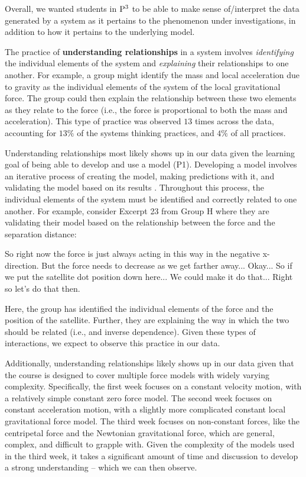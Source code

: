 \documentclass{msuphddissertation}
\begin{document}
\begin{doublespace}
Overall, we wanted students in ${\rm P}^{3}$ to be able to make sense of/interpret the data generated by a system as it pertains to the phenomenon under investigations, in addition to how it pertains to the underlying model.

The practice of \textbf{understanding relationships} in a system involves \textit{identifying} the individual elements of the system and \textit{explaining} their relationships to one another.  For example, a group might identify the mass and local acceleration due to gravity as the individual elements of the system of the local gravitational force.  The group could then explain the relationship between these two elements as they relate to the force (i.e., the force is proportional to both the mass and acceleration).  This type of practice was observed $13$ times across the data, accounting for $13\%$ of the systems thinking practices, and $4\%$ of all practices.

Understanding relationships most likely shows up in our data given the learning goal of being able to develop and use a model (P1).  Developing a model involves an iterative process of creating the model, making predictions with it, and validating the model based on its results \cite{AAPT2016}.  Throughout this process, the individual elements of the system must be identified and correctly related to one another.  For example, consider Excerpt 23 from Group H where they are validating their model based on the relationship between the force and the separation distance: \begin{description}
\SC So right now the force is just always acting in this way {in the negative x-direction}.
\SC But the force needs to decrease as we get farther away...
\SB Okay...
\SC So if we put the satellite dot position down here...
\SC We could make it do that...
\SA Right so let's do that then.
\end{description}  Here, the group has identified the individual elements of the force and the position of the satellite.  Further, they are explaining the way in which the two should be related (i.e., and inverse dependence).  Given these types of interactions, we expect to observe this practice in our data.

Additionally, understanding relationships likely shows up in our data given that the course is designed to cover multiple force models with widely varying complexity.  Specifically, the first week focuses on a constant velocity motion, with a relatively simple constant zero force model.  The second week focuses on constant acceleration motion, with a slightly more complicated constant local gravitational force model.  The third week focuses on non-constant forces, like the centripetal force and the Newtonian gravitational force, which are general, complex, and difficult to grapple with.  Given the complexity of the models used in the third week, it takes a significant amount of time and discussion to develop a strong understanding -- which we can then observe.


\end{doublespace}
\end{document}
